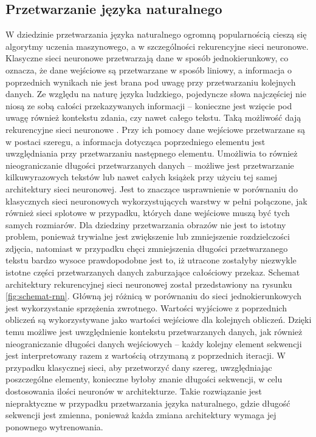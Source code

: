 \subsection{Przetwarzanie języka naturalnego}
W dziedzinie przetwarzania języka naturalnego ogromną popularnością cieszą się algorytmy uczenia maszynowego, a w szczególności rekurencyjne sieci neuronowe. Klasyczne sieci neuronowe przetwarzają dane w sposób jednokierunkowy, co oznacza, że dane wejściowe są przetwarzane w sposób liniowy, a informacja o poprzednich wynikach nie jest brana pod uwagę przy przetwarzaniu kolejnych danych. Ze względu na naturę języka ludzkiego, pojedyncze słowa najczęściej nie niosą ze sobą całości przekazywanych informacji -- konieczne jest wzięcie pod uwagę również kontekstu zdania, czy nawet całego tekstu. Taką możliwość dają rekurencyjne sieci neuronowe \cite{rnn}. Przy ich pomocy dane wejściowe przetwarzane są w postaci szeregu, a informacja dotycząca poprzedniego elementu jest uwzględniania przy przetwarzaniu następnego elementu. Umożliwia to również nieograniczanie długości przetwarzanych danych -- możliwe jest przetwarzanie kilkuwyrazowych tekstów lub nawet całych książek przy użyciu tej samej architektury sieci neuronowej. Jest to znaczące usprawnienie w porównaniu do klasycznych sieci neuronowych wykorzystujących warstwy w pełni połączone, jak również sieci splotowe w przypadku, których dane wejściowe muszą być tych samych rozmiarów. Dla dziedziny przetwarzania obrazów nie jest to istotny problem, ponieważ trywialne jest zwiększenie lub zmniejszenie rozdzielczości zdjęcia, natomiast w przypadku chęci zmniejszenia długości przetwarzanego tekstu bardzo wysoce prawdopodobne jest to, iż utracone zostałyby niezwykle istotne części przetwarzanych danych zaburzające całościowy przekaz. Schemat architektury rekurencyjnej sieci neuronowej został przedstawiony na rysunku \ref{fig:schemat-rnn}. Główną jej różnicą w porównaniu do sieci jednokierunkowych jest wykorzystanie sprzężenia zwrotnego. Wartości wyjściowe z poprzednich obliczeń są wykorzystywane jako wartości wejściowe dla kolejnych obliczeń. Dzięki temu możliwe jest uwzględnienie kontekstu przetwarzanych danych, jak również nieograniczanie długości danych wejściowych -- każdy kolejny element sekwencji jest interpretowany razem z wartością otrzymaną z poprzednich iteracji. W przypadku klasycznej sieci, aby przetworzyć dany szereg, uwzględniając poszczególne elementy, konieczne byłoby znanie długości sekwencji, w celu dostosowania ilości neuronów w architekturze. Takie rozwiązanie jest niepraktyczne w przypadku przetwarzania języka naturalnego, gdzie długość sekwencji jest zmienna, ponieważ każda zmiana architektury wymaga jej ponownego wytrenowania.
